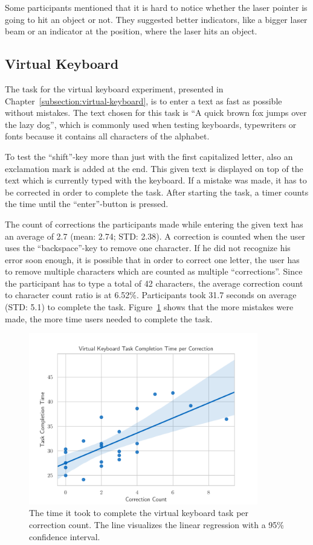 Some participants mentioned that it is hard to notice whether the laser pointer is going to hit an object or not. They suggested better indicators, like a bigger laser beam or an indicator at the position, where the laser hits an object.


\subsection{Virtual Keyboard}\label{section:eval-res-vk}

The task for the virtual keyboard experiment, presented in Chapter~\ref{subsection:virtual-keyboard}, is to enter a text as fast as possible without mistakes. The text chosen for this task is \enquote{A quick brown fox jumps over the lazy dog}, which is commonly used when testing keyboards, typewriters or fonts because it contains all characters of the alphabet.

To test the \enquote{shift}-key more than just with the first capitalized letter, also an exclamation mark is added at the end. This given text is displayed on top of the text which is currently typed with the keyboard. If a mistake was made, it has to be corrected in order to complete the task. After starting the task, a timer counts the time until the \enquote{enter}-button is pressed.

The count of corrections the participants made while entering the given text has an average of 2.7 (mean: 2.74; \ac{STD}: 2.38). A correction is counted when the user uses the \enquote{backspace}-key to remove one character. If he did not recognize his error soon enough, it is possible that in order to correct one letter, the user has to remove multiple characters which are counted as multiple \enquote{corrections}. Since the participant has to type a total of 42 characters, the average correction count to character count ratio is at 6.52\%.
Participants took 31.7 seconds on average (\ac{STD}: 5.1) to complete the task. Figure~\ref{fig:eval-exp-vk-ratio-scatter} shows that the more mistakes were made, the more time users needed to complete the task.

\begin{figure}[H]
	\centering
	\includegraphics[width=10cm]{figures/evaluation/eval_exp_vk_ratio_scatter.pdf}
	\caption[Virtual keyboard task results]{The time it took to complete the virtual keyboard task per correction count. The line visualizes the linear regression with a 95\% confidence interval.}\label{fig:eval-exp-vk-ratio-scatter}
\end{figure}

